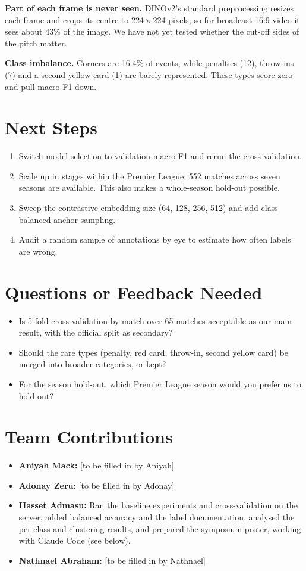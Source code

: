 \documentclass[11pt]{article}
\begin{document}
\textbf{Part of each frame is never seen.} DINOv2's standard preprocessing resizes each frame and crops
its centre to 224\,$\times$\,224 pixels, so for broadcast 16:9 video it sees about 43\% of the image. We have
not yet tested whether the cut-off sides of the pitch matter.

\textbf{Class imbalance.} Corners are 16.4\% of events, while penalties (12), throw-ins (7) and a second
yellow card (1) are barely represented. These types score zero and pull macro-F1 down.

\section*{Next Steps}
\begin{enumerate}[noitemsep]
  \item Switch model selection to validation macro-F1 and rerun the cross-validation.
  \item Scale up in stages within the Premier League: 552 matches across seven seasons are available. This
        also makes a whole-season hold-out possible.
  \item Sweep the contrastive embedding size (64, 128, 256, 512) and add class-balanced anchor sampling.
  \item Audit a random sample of annotations by eye to estimate how often labels are wrong.
\end{enumerate}

\section*{Questions or Feedback Needed}
\begin{itemize}[noitemsep]
  \item Is 5-fold cross-validation by match over 65 matches acceptable as our main result, with the official
        split as secondary?
  \item Should the rare types (penalty, red card, throw-in, second yellow card) be merged into broader
        categories, or kept?
  \item For the season hold-out, which Premier League season would you prefer us to hold out?
\end{itemize}

\section*{Team Contributions}
\begin{itemize}[noitemsep]
  \item \textbf{Aniyah Mack:} [to be filled in by Aniyah]
  \item \textbf{Adonay Zeru:} [to be filled in by Adonay]
  \item \textbf{Hasset Admasu:} Ran the baseline experiments and cross-validation on the server, added
        balanced accuracy and the label documentation, analysed the per-class and clustering results, and
        prepared the symposium poster, working with Claude Code (see below).
  \item \textbf{Nathnael Abraham:} [to be filled in by Nathnael]
\end{itemize}
\end{document}
